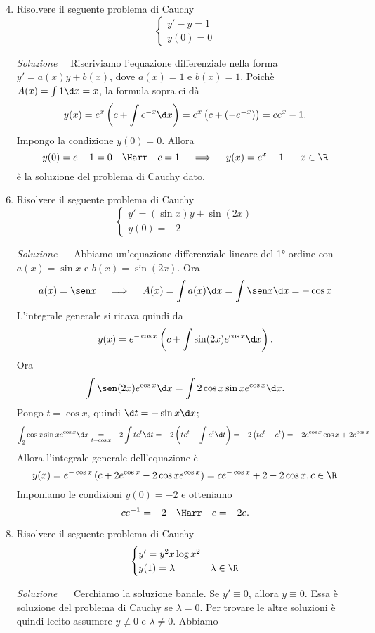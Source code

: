 \documentclass{article}
\begin{document}
\begin{enumerate}[label=\textbf{Esercizio 13.\arabic*.},itemindent=*]
\setcounter{enumi}{3}
\item Risolvere il seguente problema di Cauchy
\[\begin{cases}
    y'-y=1\\
    y(0)=0
\end{cases}\]
\item[\textit{\large Soluzione~}]~Riscriviamo l'equazione differenziale nella forma $y'=a(x)y+b(x)$, dove $a(x)=1$ e $b(x)=1$. Poichè
$A(x)=\int1\d x=x$, la formula sopra ci dà
\[y(x)=e^x\left( c+\int e^{-x}\d x \right)=e^{x}\left( c +(-e^{-x}) \right)=ce^x-1.\]
Impongo la condizione $y(0)=0$. Allora
\[y(0)=c-1 = 0~~~\Harr~~~c=1~~~\implies ~~~y(x)=e^{x}-1~~~~~x\in \R\]
è la soluzione del problema di Cauchy dato.
\item Risolvere il seguente problema di Cauchy
\[\begin{cases}
    y'=\left( \sin x \right)y+\sin(2x)\\
    y(0)=-2
\end{cases}\]
\item[\textit{\large Soluzione~}]~ Abbiamo un'equazione differenziale lineare del 1° ordine con $a(x)=\sin x$ e $b(x)=\sin (2x)$. Ora
\[a(x)=\sen x~~~\implies~~~A(x)=\int a(x)\d x=\int \sen x \d x=-\cos x\]
L'integrale generale si ricava quindi da 
\[y(x)=e^{ -\cos x}\left( c+\int \sin (2x) e^{\cos x} \d x \right).\]
Ora
\[\int \sen(2x)e^{\cos x}\d x=\int 2\cos x \sin x e^{\cos x}\d x.\]
Pongo $t=\cos x$, quindi $\d t=-\sin x \d x$;
\[\int_2\cos x \sin xe^{\cos x}\d x \underset{t =\cos x}{= } -2\int te^t\d t=-2\left( te^t-\int e^t\d t \right)=-2\left(te^t-e^t\right)=-2e^{\cos x}\cos x+2e^{\cos x}\]
Allora l'integrale generale dell'equazione è
\[y(x)=e^{-\cos x}\left( c+2e^{\cos x}-2\cos xe^{\cos x} \right)=ce^{-\cos x}+2-2\cos x, c\in \R\]
Imponiamo le condizioni $y(0)=-2$ e otteniamo
\[ce^{-1}=-2~~~\Harr~~~c=-2e .\]
\item Risolvere il seguente problema di Cauchy
\[\begin{cases}
    y'=y^2x\log x^2\\
    y(1)=\lambda&\lambda \in \R
\end{cases}\]
\item[\textit{\large Soluzione~}]~
Cerchiamo la soluzione banale. Se $y'\equiv 0$, allora $y\equiv 0$. Essa è soluzione del problema di Cauchy se $\lambda=0$.
Per trovare le altre soluzioni è quindi lecito assumere $y\not\equiv 0$ e $\lambda \neq 0$.
Abbiamo


\end{enumerate}
\end{document}
